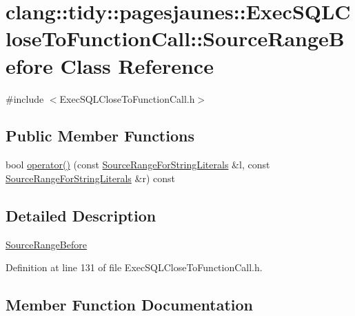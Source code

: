 \hypertarget{classclang_1_1tidy_1_1pagesjaunes_1_1_exec_s_q_l_close_to_function_call_1_1_source_range_before}{}\section{clang\+:\+:tidy\+:\+:pagesjaunes\+:\+:Exec\+S\+Q\+L\+Close\+To\+Function\+Call\+:\+:Source\+Range\+Before Class Reference}
\label{classclang_1_1tidy_1_1pagesjaunes_1_1_exec_s_q_l_close_to_function_call_1_1_source_range_before}


{\ttfamily \#include $<$Exec\+S\+Q\+L\+Close\+To\+Function\+Call.\+h$>$}

\subsection*{Public Member Functions}
\begin{DoxyCompactItemize}
\item 
bool \hyperlink{classclang_1_1tidy_1_1pagesjaunes_1_1_exec_s_q_l_close_to_function_call_1_1_source_range_before_a1afca08cf445e978c3b157f5ca251e20}{operator()} (const \hyperlink{classclang_1_1tidy_1_1pagesjaunes_1_1_exec_s_q_l_close_to_function_call_1_1_source_range_for_string_literals}{Source\+Range\+For\+String\+Literals} \&l, const \hyperlink{classclang_1_1tidy_1_1pagesjaunes_1_1_exec_s_q_l_close_to_function_call_1_1_source_range_for_string_literals}{Source\+Range\+For\+String\+Literals} \&r) const
\end{DoxyCompactItemize}


\subsection{Detailed Description}
\hyperlink{classclang_1_1tidy_1_1pagesjaunes_1_1_exec_s_q_l_close_to_function_call_1_1_source_range_before}{Source\+Range\+Before} 

Definition at line 131 of file Exec\+S\+Q\+L\+Close\+To\+Function\+Call.\+h.



\subsection{Member Function Documentation}
\mbox{\label{classclang_1_1tidy_1_1pagesjaunes_1_1_exec_s_q_l_close_to_function_call_1_1_source_range_before_a1afca08cf445e978c3b157f5ca251e20}} 
